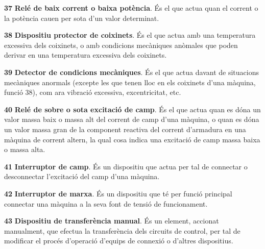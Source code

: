 \begin{multicols}{2}
\begin{list}{}
\item[\textbf{37}] 
 \textbf{Relé de baix corrent o baixa potència}. És el que actua quan el corrent o la potència cauen per
sota d'un valor determinat.

\item[\textbf{38}] 
\textbf{Dispositiu protector de coixinets}. És el que actua amb una
temperatura excessiva dels coixinets, o amb condicions mecàniques
anòmales que poden derivar en una temperatura excessiva dels
coixinets.

\item[\textbf{39}]  
\textbf{Detector de condicions mecàniques}. És el que actua davant
de situacions mecàniques anormals (excepte les que tenen lloc en els
coixinets d'una màquina, funció 38), com ara vibració excessiva,
excentricitat, etc.

\item[\textbf{40}]  
 \textbf{Relé de sobre o sota excitació de camp}. És el que actua quan es
dóna un valor massa baix o massa alt del corrent de camp d'una màquina, o quan es dóna un valor
massa gran de la component reactiva del corrent d'armadura en una màquina de corrent
altern, la qual cosa indica una excitació de camp massa baixa o massa alta.

\item[\textbf{41}]   
\textbf{Interruptor de camp}. És un dispositiu
que actua per tal de connectar o desconnectar l'excitació del camp
d'una màquina.

\item[\textbf{42}]   
\textbf{Interruptor de marxa}. És un
dispositiu que té per funció principal connectar una màquina a la
seva font de tensió de funcionament.

\item[\textbf{43}]  
 \textbf{Dispositiu de transferència manual}. És
un element, accionat manualment, que efectua la transferència dels circuits de control, per tal
 de modificar el procés d'operació d'equips de connexió o d'altres dispositius.


\end{list}
\end{multicols}

